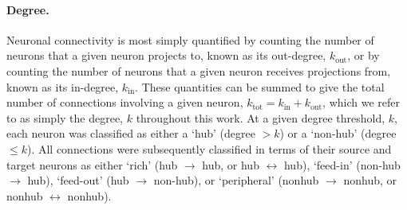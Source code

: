 \documentclass[10pt,letterpaper]{article}
\begin{document}
\paragraph{Degree.}
Neuronal connectivity is most simply quantified by counting the number of neurons that a given neuron projects to, known as its out-degree, $k_\mathrm{out}$, or by counting the number of neurons that a given neuron receives projections from, known as its in-degree, $k_\mathrm{in}$.
These quantities can be summed to give the total number of connections involving a given neuron, $k_\mathrm{tot} = k_\mathrm{in} + k_\mathrm{out}$, which we refer to as simply the degree, $k$ throughout this work.
At a given degree threshold, $k$, each neuron was classified as either a `hub' (degree $>k$) or a `non-hub' (degree $\leq k$).
All connections were subsequently classified in terms of their source and target neurons as either
`rich' (hub $\rightarrow$ hub, or hub $\leftrightarrow$ hub),
`feed-in' (non-hub $\rightarrow$ hub),
`feed-out' (hub $\rightarrow$ non-hub),
or `peripheral' (nonhub $\rightarrow$ nonhub, or nonhub $\leftrightarrow$ nonhub).
\end{document}
